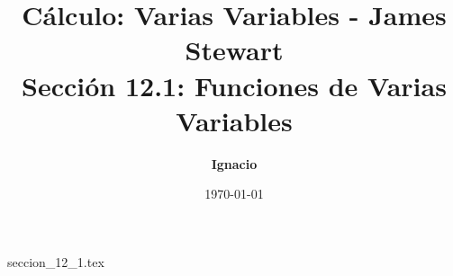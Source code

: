 \documentclass[11pt,spanish,oneside]{report}
\title{\textbf{Cálculo: Varias Variables - James Stewart} \\ \Large Sección 12.1: Funciones de Varias Variables}
\author{\textbf{Ignacio}}
\date{\today}
\begin{document}
\maketitle

{seccion_12_1.tex}
\end{document}
